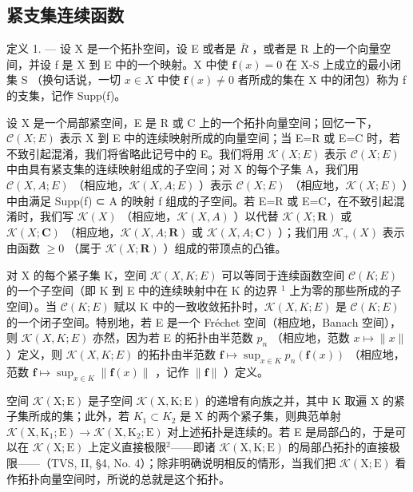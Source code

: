 \subsection{紧支集连续函数}

定义 1. --- 设 X 是一个拓扑空间，设 E 或者是 \(\overline{R}\) ，或者是 R 上的一个向量空间，并设 f 是 X 到 E 中的一个映射。X 中使 \(\mathbf{f}(x)=0\) 在 X-S 上成立的最小闭集 S （换句话说，一切 \(x\in X\) 中使 \(\mathbf{f}(x)\neq0\) 者所成的集在 X 中的闭包）称为 f 的支集，记作 Supp(f)。

设 X 是一个局部紧空间，E 是 R 或 C 上的一个拓扑向量空间；回忆一下，\(\mathcal{C}(X;E)\) 表示 X 到 E 中的连续映射所成的向量空间；当 E=R 或 E=C 时，若不致引起混淆，我们将省略此记号中的 E。我们将用 \(\mathcal{K}(X;E)\) 表示 \(\mathcal{C}(X;E)\) 中由具有紧支集的连续映射组成的子空间；对 X 的每个子集 A，我们用 \(\mathcal{C}(X,A;E)\) （相应地，\(\mathcal{K}(X,A;E)\) ）表示 \(\mathcal{C}(X;E)\) （相应地，\(\mathcal{K}(X;E)\) ）中由满足 Supp(f) ⊂ A 的映射 f 组成的子空间。若 E=R 或 E=C，在不致引起混淆时，我们写 \(\mathcal{K}(X)\) （相应地，\(\mathcal{K}(X,A)\) ）以代替 \(\mathcal{K}(X;\mathbf{R})\) 或 \(\mathcal{K}(X;\mathbf{C})\) （相应地，\(\mathcal{K}(X,A;\mathbf{R})\) 或 \(\mathcal{K}(X,A;\mathbf{C})\) ）；我们用 \(\mathcal{K}_{+}(X)\) 表示由函数 \(\geqslant0\) （属于 \(\mathcal{K}(X;\mathbf{R})\) ）组成的带顶点的凸锥。

对 X 的每个紧子集 K，空间 \(\mathcal{K}(X,K;E)\) 可以等同于连续函数空间 \(\mathcal{C}(K;E)\) 的一个子空间（即 K 到 E 中的连续映射中在 K 的边界 \(^{1}\) 上为零的那些所成的子空间）。当 \(\mathcal{C}(K;E)\) 赋以 K 中的一致收敛拓扑时，\(\mathcal{K}(X,K;E)\) 是 \(\mathcal{C}(K;E)\) 的一个闭子空间。特别地，若 E 是一个 Fréchet 空间（相应地，Banach 空间），则 \(\mathcal{K}(X,K;E)\) 亦然，因为若 E 的拓扑由半范数 \(p_{n}\) （相应地，范数 \(x \mapsto \|x\|\) ）定义，则 \(\mathcal{K}(X,K;E)\) 的拓扑由半范数 \(\mathbf{f} \mapsto \sup_{x \in K} p_n(\mathbf{f}(x))\) （相应地，范数 \(\mathbf{f} \mapsto \sup_{x \in K} \| \mathbf{f}(x) \|\) ，记作 \(\| \mathbf{f} \|\) ）定义。

空间 \(\mathcal{K}(\mathrm{X};\mathrm{E})\) 是子空间 \(\mathcal{K}(\mathrm{X},\mathrm{K};\mathrm{E})\) 的递增有向族之并，其中 K 取遍 X 的紧子集所成的集；此外，若 \(K_{1}\subset K_{2}\) 是 X 的两个紧子集，则典范单射 \(\mathcal{K}(\mathrm{X},\mathrm{K}_{1};\mathrm{E})\to\mathcal{K}(\mathrm{X},\mathrm{K}_{2};\mathrm{E})\) 对上述拓扑是连续的。若 E 是局部凸的，于是可以在 \(\mathcal{K}(\mathrm{X};\mathrm{E})\) 上定义直接极限\(^{2}\)——即诸 \(\mathcal{K}(\mathrm{X},\mathrm{K};\mathrm{E})\) 的局部凸拓扑的直接极限——（TVS, II, §4, No. 4）；除非明确说明相反的情形，当我们把 \(\mathcal{K}(\mathrm{X};\mathrm{E})\) 看作拓扑向量空间时，所说的总就是这个拓扑。


